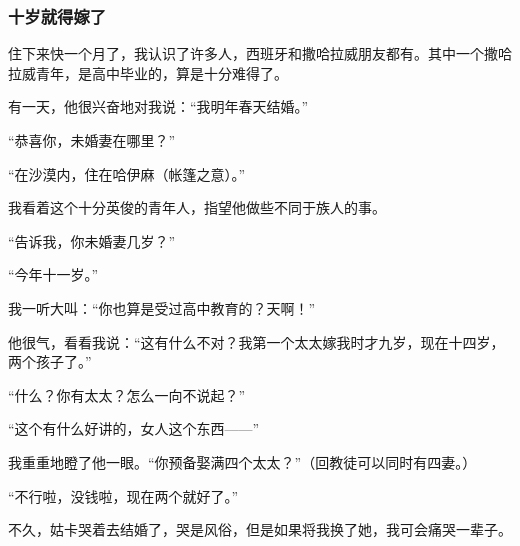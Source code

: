 \subsubsection*{十岁就得嫁了}
\par 住下来快一个月了，我认识了许多人，西班牙和撒哈拉威朋友都有。其中一个撒哈拉威青年，是高中毕业的，算是十分难得了。
\par 有一天，他很兴奋地对我说：“我明年春天结婚。”
\par “恭喜你，未婚妻在哪里？”
\par “在沙漠内，住在哈伊麻（帐篷之意）。”
\par 我看着这个十分英俊的青年人，指望他做些不同于族人的事。
\par “告诉我，你未婚妻几岁？”
\par “今年十一岁。”
\par 我一听大叫：“你也算是受过高中教育的？天啊！”
\par 他很气，看看我说：“这有什么不对？我第一个太太嫁我时才九岁，现在十四岁，两个孩子了。”
\par “什么？你有太太？怎么一向不说起？”
\par “这个有什么好讲的，女人这个东西——”
\par 我重重地瞪了他一眼。“你预备娶满四个太太？”（回教徒可以同时有四妻。）
\par “不行啦，没钱啦，现在两个就好了。”
\par 不久，姑卡哭着去结婚了，哭是风俗，但是如果将我换了她，我可会痛哭一辈子。
